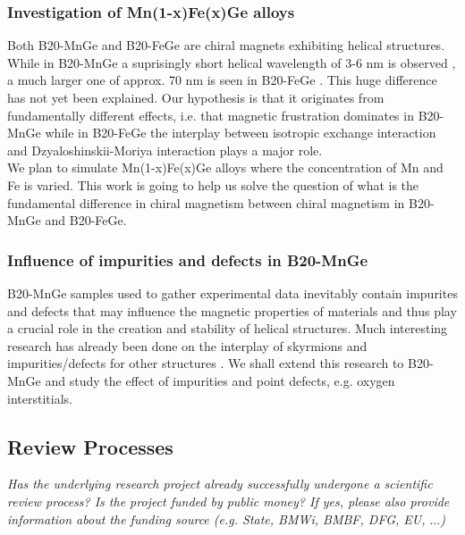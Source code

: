 \documentclass [a4paper, 12pt]{article}
\begin{document}
\subsubsection{Investigation of Mn(1-x)Fe(x)Ge alloys}
Both B20-MnGe and B20-FeGe are chiral magnets exhibiting helical structures. While in
B20-MnGe a suprisingly short helical wavelength of 3-6 nm is observed \cite{tanigaki_real-space_2015},
a much larger one of
approx. 70 nm is seen in B20-FeGe \cite{lebech_magnetic_1989}. This huge difference has not yet been explained.
Our hypothesis is that it originates from fundamentally different effects, i.e. that
magnetic frustration dominates in B20-MnGe while in B20-FeGe the interplay between
isotropic exchange interaction and Dzyaloshinskii-Moriya interaction plays a major role.
\\
We plan to
simulate Mn(1-x)Fe(x)Ge alloys where the concentration of Mn and Fe is varied.
This work is going to help us solve the question of what is the fundamental difference in chiral magnetism
between
chiral magnetism in B20-MnGe and B20-FeGe.

\subsubsection{Influence of impurities and defects in B20-MnGe}
B20-MnGe samples used to gather experimental data inevitably contain impurites and defects 
that may influence the magnetic properties of materials and thus play a crucial role
in the creation and stability of helical structures.
Much interesting research has already been done on the interplay of
skyrmions and impurities/defects for other structures
\cite{fert_skyrmions_2013,woo_observation_2016,jiang_direct_2016,crum_perpendicular_2015}.
We shall extend this research to B20-MnGe and
study the effect of impurities and point defects, e.g. oxygen interstitials.

\subsection{Review Processes}
\textit{Has the underlying research project already successfully undergone a scientific review process? Is the project funded by public money?
If yes, please also provide information about the funding source
(e.g. State, BMWi, BMBF, DFG, EU, $\dots$)}
\end{document}
